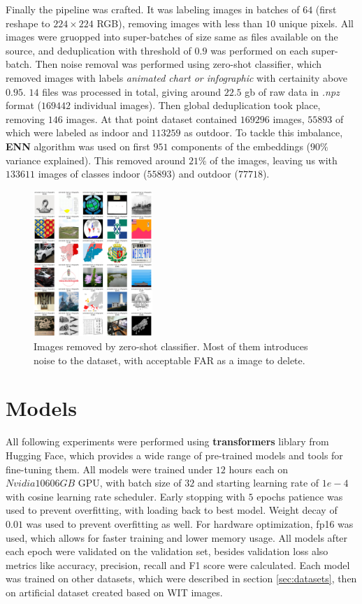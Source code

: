 \documentclass[a4paper]{article}
\begin{document}
Finally the pipeline was crafted. It was labeling images in batches of $64$ (first reshape to $224\times224$ RGB), removing images with less than $10$ unique pixels. All images were gruopped  into super-batches of size same as files available on the source, and deduplication with threshold of $0.9$ was performed on each super-batch. Then noise removal was performed using zero-shot classifier, which removed images with labels \textit{animated chart or infographic} with certainity above $0.95$. $14$ files was processed in total, giving around $22.5$ gb of raw data in \textit{.npz} format ($169442$ individual images). Then global deduplication took place, removing $146$ images. At that point dataset contained $169296$ images, $55893$ of which were labeled as indoor and $113259$ as outdoor. To tackle this imbalance, \textbf{ENN} algorithm was used on first $951$ components of the embeddings ($90\%$ variance explained). This removed around $21\%$ of the images, leaving us with $133611$ images of classes indoor ($55893$) and outdoor ($77718$).

\begin{figure}[H]
    \centering
    \includegraphics[width=0.4\textwidth]{images/zero-shot.png}
    \caption{Images removed by zero-shot classifier. Most of them introduces noise to the dataset, with acceptable FAR as a image to delete.}
\end{figure}

\section{Models}
\label{sec:models}

All following experiments were performed using \textbf{transformers} liblary from Hugging Face, which provides a wide range of pre-trained models and tools for fine-tuning them. All models were trained under $12$ hours each on $Nvidia 1060 6GB$ GPU, with batch size of $32$ and starting learning rate of $1e-4$ with cosine learning rate scheduler. Early stopping with $5$ epochs patience was used to prevent overfitting, with loading back to best model. Weight decay of $0.01$ was used to prevent overfitting as well. For hardware optimization, fp16 was used, which allows for faster training and lower memory usage. All models after each epoch were validated on the validation set, besides validation loss also metrics like accuracy, precision, recall and F1 score were calculated. Each model was trained on other datasets, which were described in section \ref{sec:datasets}, then on artificial dataset created based on WIT images.
\end{document}

